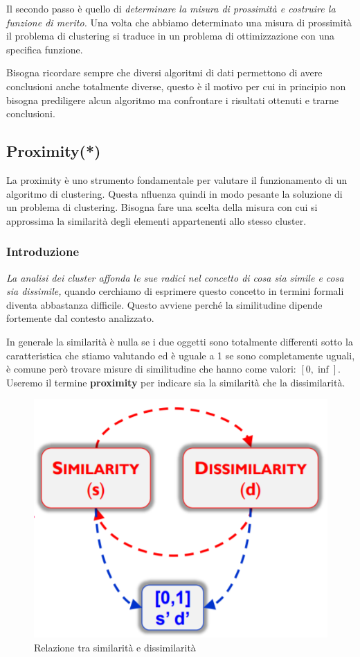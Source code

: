 Il secondo passo è quello di \textit{determinare la misura di prossimità e costruire la funzione di merito.} Una volta che abbiamo determinato una misura di prossimità il problema di clustering si traduce in un problema di ottimizzazione con una specifica funzione.

Bisogna ricordare sempre che diversi algoritmi di dati permettono di avere conclusioni anche totalmente diverse, questo è il motivo per cui in principio non bisogna prediligere alcun algoritmo ma confrontare i risultati ottenuti e trarne conclusioni.


\subsection{Proximity(*)}

La proximity è uno strumento fondamentale per valutare il funzionamento di un algoritmo di clustering. Questa nfluenza quindi in modo pesante la soluzione di un problema di clustering. Bisogna fare una scelta della misura con cui si approssima la similarità degli elementi appartenenti allo stesso cluster.
\subsubsection{Introduzione}
\textit{La analisi dei cluster affonda le sue radici nel concetto di cosa sia simile e cosa sia dissimile,} quando cerchiamo di esprimere questo concetto  in termini formali diventa abbastanza difficile. Questo avviene perché la similitudine dipende fortemente dal contesto analizzato.

In generale la similarità è nulla se i due oggetti sono totalmente differenti sotto la caratteristica che stiamo valutando ed è uguale a 1 se sono completamente uguali, è comune però trovare misure di similitudine che hanno come valori:  $[0,\inf]$. Useremo il termine \textbf{proximity} per indicare sia la similarità che la dissimilarità. 

\begin{figure}[H]
	\centering
	\includegraphics[height=0.45 \linewidth]{clustering/pict/simil_diss.png}
	\caption{Relazione tra similarità e dissimilarità}
\end{figure}

